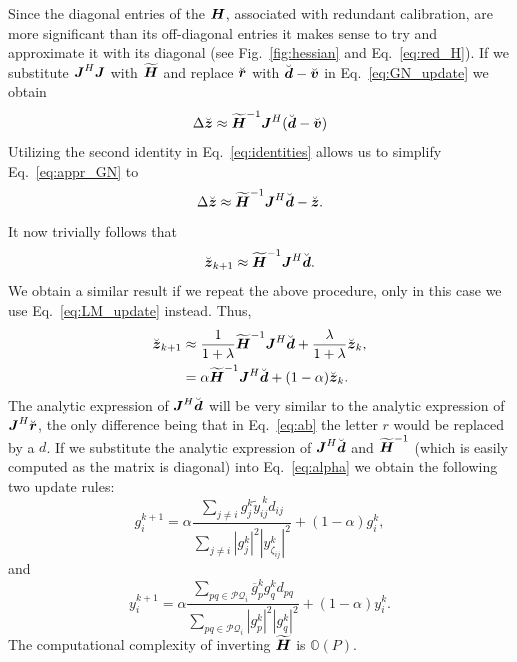 \documentclass[useAMS,usenatbib]{mn2e}
\newcommand{\bz}{\bmath{z}}
\newcommand{\br}{\bmath{r}}
\newcommand{\bd}{\bmath{d}}
\newcommand{\bv}{\bmath{v}}
\newcommand{\bJ}{\bmath{J}}
\newcommand{\bH}{\bmath{H}}
\newcommand{\conj}[1]{\overline{#1}}
\begin{document}
Since the diagonal entries of the $\bH$, associated with redundant calibration, are more significant than its off-diagonal entries it makes 
sense to try and approximate it with its diagonal (see Fig.~\ref{fig:hessian} and Eq.~\eqref{eq:red_H}).
If we substitute $\bJ^H\bJ$ with $\widetilde{\bH}$ and replace $\breve{\br}$ with $\breve{\bd} - \breve{\bv}$ in Eq.~\eqref{eq:GN_update} we obtain
\begin{equation}
\label{eq:appr_GN}
 \Delta \breve{\bz} \approx \widetilde{\bH}^{-1}\bJ^H(\breve{\bd}-\breve{\bv})
\end{equation}
Utilizing the second identity in Eq.~\eqref{eq:identities} allows us to simplify Eq.~\eqref{eq:appr_GN} to
\begin{equation}
  \Delta \breve{\bz} \approx \widetilde{\bH}^{-1}\bJ^H\breve{\bd}-\breve{\bz}.
\end{equation}
It now trivially follows that
\begin{equation}
 \breve{\bz}_{k+1} \approx \widetilde{\bH}^{-1}\bJ^H\breve{\bd}.
\end{equation}
We obtain a similar result if we repeat the above procedure, only in this case we use Eq.~\eqref{eq:LM_update} instead. Thus,
\begin{align}
\breve{\bz}_{k+1} &\approx \frac{1}{1+\lambda}\widetilde{\bH}^{-1}\bJ^H\breve{\bd} + \frac{\lambda}{1+\lambda} \breve{\bz}_k,\label{eq:lambda}\\
 &= \alpha \widetilde{\bH}^{-1}\bJ^H\breve{\bd} + (1-\alpha)\breve{\bz}_k. \label{eq:alpha}  
\end{align}
The analytic expression of $\bJ^H\breve{\bd}$ will be very similar to the analytic 
expression of $\bJ^H\breve{\br}$, the only difference being that in Eq.~\eqref{eq:ab} the letter $r$ would be replaced by a $d$. If we substitute the analytic expression
of $\bJ^H\breve{\bd}$ and $\widetilde{\bH}^{-1}$ (which is easily computed as the matrix is diagonal) into Eq.~\eqref{eq:alpha} we obtain the following two update rules:
\begin{equation}
\label{eq:g_update}
g_{i}^{k+1} = \alpha \frac{\sum_{j\neq i} g_j^k \widetilde{y}_{ij}^{~\!\!k} d_{ij}}{\sum_{j\neq i} |g_j^k|^2|y_{\zeta_{ij}}^k|^2} + (1-\alpha) g_i^k, 
\end{equation}
and
\begin{equation}
\label{eq:y_update}
y_{i}^{k+1} = \alpha \frac{\sum_{pq \in \mathcal{PQ}_i} \conj{g}_p^k g_q^k d_{pq}}{\sum_{pq \in \mathcal{PQ}_i}|g_p^k|^2|g_q^k|^2} + (1-\alpha) y_i^k. 
\end{equation}
The computational complexity of inverting $\widetilde{\bH}$ is $\mathbb{O}(P)$.
\end{document}
